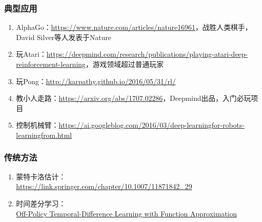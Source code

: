 \documentclass[lang=cn,11pt,a4paper]{eleganttemplate}
\begin{document}
\subsubsection{典型应用}
\begin{enumerate}
    \item AlphaGo：\href{https://www.nature.com/articles/nature16961}{https://www.nature.com/articles/nature16961}，战胜人类棋手，David Silver等人发表于Nature
    \item 玩Atari：\href{https://deepmind.com/research/publications/playing-atari-deep-reinforcement-learning}{https://deepmind.com/research/publications/playing-atari-deep-reinforcement-learning}，游戏领域超过普通玩家
    \item 玩Pong：\href{http://karpathy.github.io/2016/05/31/rl/}{http://karpathy.github.io/2016/05/31/rl/} 
    \item 教小人走路：\href{https://arxiv.org/abs/1707.02286}{https://arxiv.org/abs/1707.02286}，Deepmind出品，入门必玩项目
    \item 控制机械臂：\href{https://ai.googleblog.com/2016/03/deep-learningfor-robots-learningfrom.html}{https://ai.googleblog.com/2016/03/deep-learningfor-robots-learningfrom.html}
\end{enumerate}

\subsubsection{传统方法}
\begin{enumerate}
    \item 蒙特卡洛估计：\\
    \href{https://link.springer.com/chapter/10.1007/11871842_29}{https://link.springer.com/chapter/10.1007/11871842\_29}
    \item 时间差分学习：\\
    \href{https://www.researchgate.net/publication/2371944_Off-Policy_Temporal-Difference_Learning_with_Function_Approximation}{Off-Policy Temporal-Difference Learning with Function Approximation}
\end{enumerate}
\end{document}
